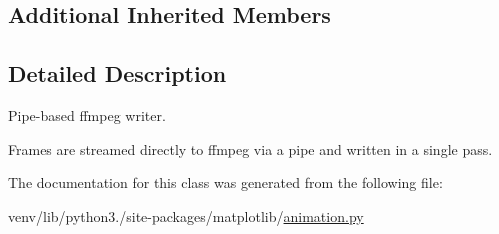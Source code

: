 \subsection*{Additional Inherited Members}


\subsection{Detailed Description}
\begin{DoxyVerb}Pipe-based ffmpeg writer.

Frames are streamed directly to ffmpeg via a pipe and written in a single
pass.
\end{DoxyVerb}
 

The documentation for this class was generated from the following file\+:\begin{DoxyCompactItemize}
\item 
venv/lib/python3./site-\/packages/matplotlib/\hyperlink{animation_8py}{animation.\+py}\end{DoxyCompactItemize}
